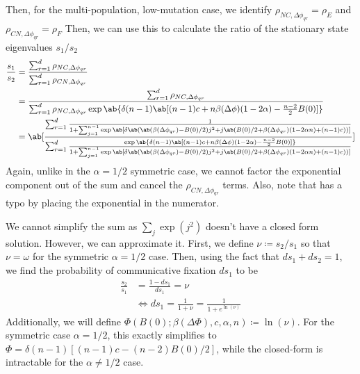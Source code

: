 \documentclass[pdflatex,lineno,referee,sn-mathphys-ay]{sn-jnl}
\begin{document}
Then, for the multi-population, low-mutation case, we identify
$\rho_{NC,\Delta \phi_{qr}} = \rho_E$ and $\rho_{CN,\Delta \phi_{qr}} = \rho_F$
Then, we can use this to calculate the ratio of the stationary state
eigenvalues $s_1/s_2$
\begin{align}
  \frac{s_1}{s_2} &= \frac{\sum_{r=1}^{d} \rho_{NC,\Delta \phi_{qr}} }
  {\sum_{r=1}^{d} \rho_{CN,\Delta \phi_{qr}}} \\
                  &= \frac{\sum_{r=1}^{d} \rho_{NC,\Delta \phi_{qr}}
                  }
  {\sum_{r=1}^{d} \rho_{NC,\Delta \phi_{qr}}
                \exp \ab\{
                \delta (n-1)
                \ab[
                (n-1) c + n \beta(\Delta\phi) (1 - 2 \alpha)
                - \frac{n-2}{2} B(0)
                 ]
                 \}
               }
               \\
      &=
      \ab[
\frac
{\sum_{r=1}^{d}
  \frac{1}{1+\sum_{j=1}^{n-1} \exp\ab[\delta \ab(
           \ab(\beta(\Delta\phi_{qr}) - B(0)/2) j^2
           + j \ab(B(0)/2 + \beta(\Delta\phi_{qr}) (1 - 2 \alpha n)  + (n-1) c))]}
                  }
{\sum_{r=1}^{d}
  \frac{\exp \ab\{
                \delta (n-1)
                \ab[
                (n-1) c + n \beta(\Delta\phi) (1 - 2 \alpha)
                - \frac{n-2}{2} B(0)
                 ]
                 \}
}{1+\sum_{j=1}^{n-1} \exp\ab[\delta \ab(
           \ab(\beta(\Delta\phi_{qr}) - B(0)/2) j^2
           + j \ab(B(0)/2 + \beta(\Delta\phi_{qr}) (1 - 2 \alpha n)  +
         (n-1) c))]}
                               }
                               ]
  \label{eq:full_analytic}
\end{align}
Again, unlike in the $\alpha = 1/2$ symmetric case, we cannot factor the
exponential component out of the sum and cancel the $\rho_{CN,\Delta
\phi_{qr}}$ terms.
Also, note that \cite{tripp2022evolutionary} has a typo by placing the
exponential in the numerator.

We cannot simplify the sum as $\sum_j \exp(j^2)$ doesn't have a closed form solution.
However, we can approximate it.
First, we define $\nu \coloneqq s_2/s_1$ so that $\nu = \omega$ for the
symmetric $\alpha = 1/2$ case.
Then, using the fact that $d s_1 + d s_2 = 1$, we find the probability
of communicative fixation $d s_1$ to be
\begin{equation}
  \begin{aligned}
    \frac{s_2}{s_1} &= \frac{1 - d s_1}{d s_1} = \nu \\
                    &\iff d s_1 = \frac{1}{1+\nu} =
                    \frac{1}{1+e^{\ln(\nu)}}
  \end{aligned}
\end{equation}
Additionally, we will define $\Phi(B(0);\beta(\Delta\Phi),c,\alpha,n)
\coloneqq \ln(\nu)$.
For the symmetric case $\alpha=1/2$, this exactly simplifies to $\Phi =
\delta(n-1)[(n-1)c - (n-2)B(0)/2]$, while the closed-form is intractable
for the $\alpha \neq 1/2$ case.
\end{document}

